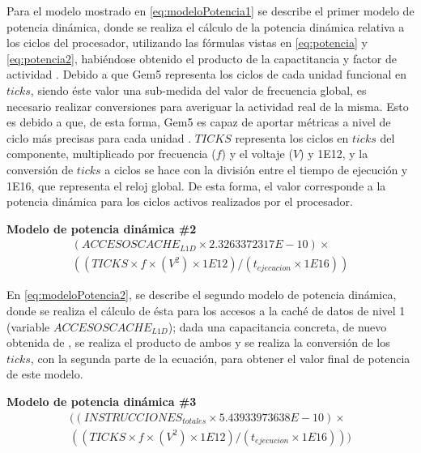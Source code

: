 Para el modelo mostrado en \ref{eq:modeloPotencia1} se describe el primer modelo de potencia dinámica, donde se realiza el cálculo de la potencia dinámica relativa a los ciclos del procesador, utilizando las fórmulas vistas en \ref{eq:potencia} y \ref{eq:potencia2}, habiéndose obtenido el producto de la capactitancia y factor de actividad \cite{soton393728} \cite{soton418538}. Debido a que Gem5 representa los ciclos de cada unidad funcional en $ticks$, siendo éste valor una sub-medida del valor de frecuencia global, es necesario realizar conversiones para averiguar la actividad real de la misma. Esto es debido a que, de esta forma, Gem5 es capaz de aportar métricas a nivel de ciclo más precisas para cada unidad \cite{gem5-ticks-referencia1} \cite{gem5-ticks-referencia2}. $TICKS$ representa los ciclos en $ticks$ del componente, multiplicado por frecuencia ($f$) y el voltaje ($V$) y 1E12, y la conversión de $ticks$ a ciclos se hace con la división entre el tiempo de ejecución y 1E16, que representa el reloj global. De esta forma, el valor corresponde a la potencia dinámica para los ciclos activos realizados por el procesador. 

\par{\textbf{Modelo de potencia dinámica \#2}}{
\begin{equation}
\begin{split}
(ACCESOSCACHE_{L1D} \times 2.3263372317E-10) \times \\ ((TICKS \times f \times (V^2) \times 1E12) / (t_{ejecucion} \times 1E16))
\end{split}
\label{eq:modeloPotencia2}
\end{equation}
}

En \ref{eq:modeloPotencia2}, se describe el segundo modelo de potencia dinámica, donde se realiza el cálculo de ésta para los accesos a la caché de datos de nivel 1 (variable $ACCESOSCACHE_{L1D}$); dada una capacitancia concreta, de nuevo obtenida de \cite{soton393728} \cite{soton418538}, se realiza el producto de ambos y se realiza la conversión de los $ticks$, con la segunda parte de la ecuación, para obtener el valor final de potencia de este modelo.

\par{\textbf{Modelo de potencia dinámica \#3}}{
\begin{equation}
\begin{split}
((INSTRUCCIONES_{totales} \times 5.43933973638E-10) \times \\ ((TICKS \times f \times (V^2) \times 1E12) / (t_{ejecucion} \times 1E16)))
\end{split}
\label{eq:modeloPotencia3}
\end{equation}
}

